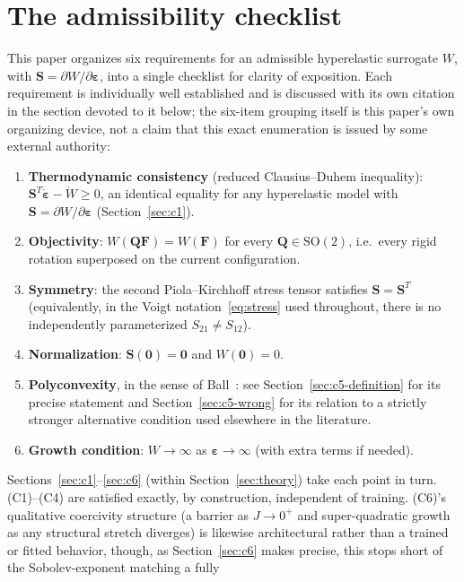 \documentclass[10pt,a4paper]{article}
\newcommand{\SO}{\mathrm{SO}(2)}
\begin{document}
\section{The admissibility checklist}
\label{sec:checklist}
This paper organizes six requirements for an admissible hyperelastic
surrogate $W$, with $\bm S=\partial W/\partial\bm\varepsilon$, into a
single checklist for clarity of exposition. Each requirement is
individually well established and is discussed with its own citation in
the section devoted to it below; the six-item grouping itself is this
paper's own organizing device, not a claim that this exact
enumeration is issued by some external authority:
\begin{enumerate}
 \item[\textbf{(C1)}] \textbf{Thermodynamic consistency} (reduced
 Clausius--Duhem inequality): $\bm S^T\dot{\bm\varepsilon}-\dot W\geq0$, an
 identical equality for any hyperelastic model with $\bm
 S=\partial W/\partial\bm\varepsilon$ (Section~\ref{sec:c1}).
 \item[\textbf{(C2)}] \textbf{Objectivity}: $W(\bm Q\bm F)=W(\bm F)$ for
 every $\bm Q\in\SO$, i.e.\ every rigid rotation superposed on the
 current configuration.
 \item[\textbf{(C3)}] \textbf{Symmetry}: the second Piola--Kirchhoff
 stress tensor satisfies $\bm S=\bm S^T$ (equivalently, in the Voigt
 notation~\eqref{eq:stress} used throughout, there is no independently
 parameterized $S_{21}\neq S_{12}$).
 \item[\textbf{(C4)}] \textbf{Normalization}: $\bm S(\bm 0)=\bm0$ and
 $W(\bm0)=0$.
 \item[\textbf{(C5)}] \textbf{Polyconvexity}, in the sense of
 Ball~\cite{Ball1977}: see Section~\ref{sec:c5-definition} for its
 precise statement and Section~\ref{sec:c5-wrong} for its relation to a
 strictly stronger alternative condition used elsewhere in the
 literature.
 \item[\textbf{(C6)}] \textbf{Growth condition}: $W\to\infty$ as
 $\bm\varepsilon\to\infty$ (with extra terms if needed).
\end{enumerate}
Sections~\ref{sec:c1}--\ref{sec:c6} (within Section~\ref{sec:theory})
take each point in turn.  (C1)--(C4) are satisfied exactly, by
construction, independent of training.  (C6)'s qualitative coercivity
structure (a barrier as $J\to0^+$ and super-quadratic growth as any
structural stretch diverges) is likewise architectural rather than a
trained or fitted behavior, though, as Section~\ref{sec:c6} makes
precise, this stops short of the Sobolev-exponent matching a fully
\end{document}
